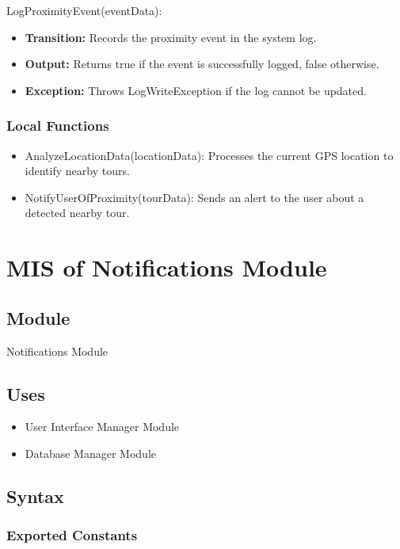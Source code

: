 \documentclass[12pt, titlepage]{article}
\begin{document}
\noindent LogProximityEvent(eventData):
\begin{itemize}
  \item \textbf{Transition:} Records the proximity event in the system log.
  \item \textbf{Output:} Returns true if the event is successfully logged, false otherwise.
  \item \textbf{Exception:} Throws LogWriteException if the log cannot be updated.
\end{itemize}

\subsubsection{Local Functions}

\begin{itemize}
  \item AnalyzeLocationData(locationData): Processes the current GPS location to identify nearby tours.
  \item NotifyUserOfProximity(tourData): Sends an alert to the user about a detected nearby tour.
\end{itemize}

\newpage


\section{MIS of Notifications Module} \label{Module_Notifications}

\subsection{Module}

Notifications Module

\subsection{Uses}

\begin{itemize}
  \item User Interface Manager Module
  \item Database Manager Module
\end{itemize}

\subsection{Syntax}

\subsubsection{Exported Constants}
\end{document}
